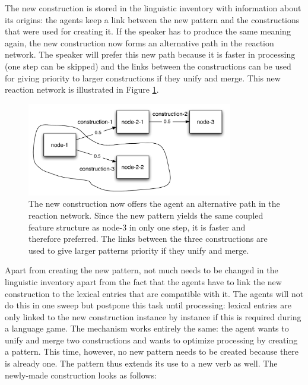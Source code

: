 The new construction is stored in the linguistic inventory with information about its origins: the agents keep a link between the new pattern and the constructions that were used for creating it. If the speaker has to produce the same meaning again, the new construction now forms an alternative path in the reaction network. The speaker will prefer this new path because it is faster in processing (one step can be skipped) and the links between the constructions can be used for giving priority to larger constructions if they unify and merge. This new reaction network is illustrated in Figure \ref{f:reaction2}.
\begin{figure}[h]
\centerline{\includegraphics[width=0.8\textwidth]{Chapter4/figs/reaction2}}
  \caption[A reaction network with the new pattern]{The new construction now offers the agent an alternative path in the reaction network. Since the new pattern yields the same coupled feature structure as node-3 in only one step, it is faster and therefore preferred. The links between the three constructions are used to give larger patterns priority if they unify and merge.}
   \label{f:reaction2}
\end{figure}

Apart from creating the new pattern, not much needs to be changed in the linguistic inventory apart from the fact that the agents have to link the new construction to the lexical entries that are compatible with it. The agents will not do this in one sweep but postpone this task until processing: lexical entries are only linked to the new construction instance by instance if this is required during a language game. The mechanism works entirely the same: the agent wants to unify and merge two constructions and wants to optimize processing by creating a pattern. This time, however, no new pattern needs to be created because there is already one. The pattern thus extends its use to a new verb as well. The newly-made construction looks as follows:

